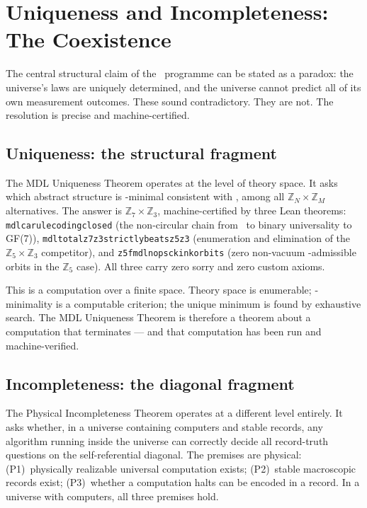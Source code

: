 \documentclass[11pt,openany]{book}
\theoremstyle{remark}
\newcommand{\GTE}{\text{GTE}}
\newcommand{\MDL}{\text{MDL}}
\newcommand{\PSC}{\text{PSC}}
\newcommand{\ZS}{\mathbb{Z}_7}
\newcommand{\lean}[1]{%
  \penalty-100
  \begingroup\def\_{\textunderscore\allowbreak}\texttt{#1}\endgroup}
\begin{document}
\section{Uniqueness and Incompleteness: The Coexistence}
\label{sec:coexistence}

The central structural claim of the \GTE\ programme can be stated as a paradox:
the universe's laws are uniquely determined, and the universe cannot predict all
of its own measurement outcomes. These sound contradictory. They are not. The
resolution is precise and machine-certified.

\subsection*{Uniqueness: the structural fragment}

The MDL Uniqueness Theorem operates at the level of theory space. It asks which abstract structure
is \MDL-minimal consistent with \PSC, among all $\mathbb{Z}_N \times \mathbb{Z}_M$
alternatives. The answer is $\ZS \times \mathbb{Z}_3$, machine-certified by three
Lean theorems: \lean{mdl\_ca\_rule\_coding\_closed} (the non-circular chain from
\PSC\ to binary universality to GF(7)), \lean{mdl\_total\_z7z3\_strictly\_beats\_z5z3}
(enumeration and elimination of the $\mathbb{Z}_5 \times \mathbb{Z}_3$ competitor),
and \lean{z5\_fmdl\_no\_psc\_kink\_orbits} (zero non-vacuum \PSC-admissible orbits
in the $\mathbb{Z}_5$ case). All three carry zero sorry and zero custom axioms.

This is a computation over a finite space. Theory space is enumerable; \MDL-minimality
is a computable criterion; the unique minimum is found by exhaustive search. The MDL Uniqueness Theorem
is therefore a theorem about a computation that terminates --- and that computation
has been run and machine-verified.

\subsection*{Incompleteness: the diagonal fragment}

The Physical Incompleteness Theorem operates at a different level entirely. It asks
whether, in a universe containing computers and stable records, any algorithm running
inside the universe can correctly decide all record-truth questions on the
self-referential diagonal. The premises are physical: (P1)~physically realizable
universal computation exists; (P2)~stable macroscopic records exist; (P3)~whether
a computation halts can be encoded in a record. In a universe with computers, all
three premises hold.
\end{document}

